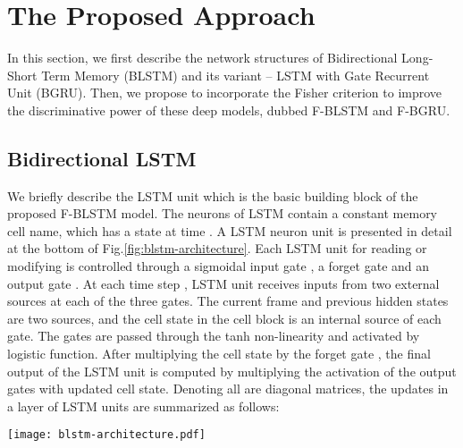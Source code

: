 \documentclass[review]{elsarticle}
\begin{document}
\section{The Proposed Approach}\label{sec:approach}
In this section, we first describe the network structures of {Bidirectional Long-Short Term Memory (BLSTM) and its variant -- LSTM with Gate Recurrent Unit (BGRU).} Then, we propose to incorporate the Fisher criterion to improve the discriminative power of these deep models, dubbed F-BLSTM and F-BGRU.

\subsection{Bidirectional LSTM}\label{sec:blstm}
We briefly describe the LSTM unit which is the basic building block of the proposed F-BLSTM model. The neurons of LSTM contain a constant memory cell name, which has a state  at time . {A LSTM neuron unit is presented in detail at the bottom of Fig.\;\ref{fig:blstm-architecture}}. Each LSTM unit for reading or modifying is controlled through a sigmoidal input gate , a forget gate  and an output gate . At each time step , {LSTM unit receives inputs from two external sources at each of the three gates.} The current frame  and previous hidden states  are two sources, and the cell state  in the cell block is an internal source of each gate. The gates are passed through the tanh non-linearity and activated by logistic function. After multiplying the cell state by the forget gate , the final output of the LSTM unit  is computed by multiplying the activation  of the output gates with updated cell state. Denoting all  are diagonal matrices, the updates in a layer of LSTM units are summarized as follows:


\begin{figure*}
	\centering
\texttt{[image: blstm-architecture.pdf]}
\caption{{The architecture of F-BLSTM. We intuitively change the loss function of BLSTM, and the resulting algorithm does not affect the training convergence and the model size, but leading to a performance improvement.}}
	\label{fig:blstm-architecture}
\end{figure*}
\end{document}
